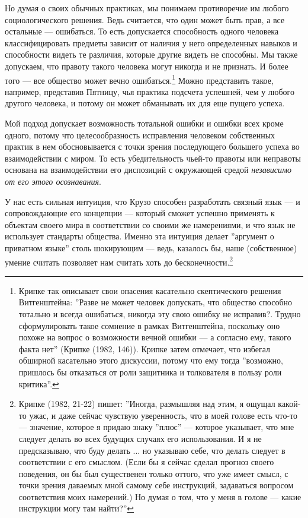\documentclass[11pt]{book}
\begin{document}
Но думая о своих обычных практиках, мы понимаем противоречие им любого социологического решения. Ведь считается, что один может быть прав, а все остальные --- ошибаться. То есть допускается способность одного человека классифицировать предметы зависит от наличия у него определенных навыков и способности видеть те различия, которые другие видеть не способны. Мы также допускаем, что правоту такого человека могут никогда и не признать. И более того --- все общество может вечно ошибаться.\footnote{Крипке так описывает свои опасения касательно скептического решения Витгенштейна: ''Разве не может человек допускать, что общество способно тотально и всегда ошибаться, никогда эту свою ошибку не исправив?. Трудно сформулировать такое сомнение в рамках Витгенштейна, поскольку оно похоже на вопрос о возможности вечной ошибки --- а согласно ему, такого факта нет'' (Крипке (1982, 146)). Крипке затем отмечает, что избегал обширной касательно этого дискуссии, потому что ему тогда ''возможно, пришлось бы отказаться от роли защитника и толкователя в пользу роли критика''.} Можно представить такое, например, представив Пятницу, чья практика подсчета успешней, чем у любого другого человека, и потому он может обманывать их для еще пущего успеха.

Мой подход допускает возможность тотальной ошибки и ошибки всех кроме одного, потому что целесообразность исправления человеком собственных практик в нем обосновывается с точки зрения последующего большего успеха во взаимодействии с миром. То есть убедительность чьей-то правоты или неправоты основана на взаимодействии его диспозиций с окружающей средой \textit{независимо от его этого осознавания}.

У нас есть сильная интуиция, что Крузо способен разработать связный язык --- и сопровождающие его концепции --- который сможет успешно применять к объектам своего мира в соответствии со своими же намерениями, и что язык не использует стандарты общества. Именно эта интуиция делает ''аргумент о приватном языке'' столь шокирующим --- ведь, казалось бы, наше (собственное) умение считать позволяет нам считать хоть до бесконечности.\footnote{Крипке (1982, 21-22) пишет: ''Иногда, размышляя над этим, я ощущал какой-то ужас, и даже сейчас чувствую уверенность, что в моей голове есть что-то --- значение, которое я придаю знаку ''плюс'' --- которое указывает, что мне следует делать во всех будущих случаях его использования. И я не предсказываю, что буду делать ... но указываю себе, что делать следует в соответствии с его смыслом. (Если бы я сейчас сделал прогноз своего поведения, он бы был существенен только оттого, что уже имеет смысл, с точки зрения даваемых мной самому себе инструкций, задаваться вопросом соответствия моих намерений.) Но думая о том, что у меня в голове --- какие инструкции могу там найти?''}
\end{document}

